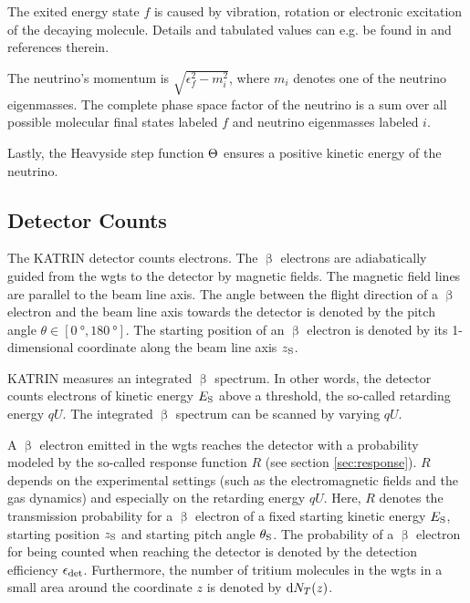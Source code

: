 The exited energy state $f$ is caused by vibration, rotation or electronic excitation of the decaying molecule. Details and tabulated values can e.g. be found in \cite{Bodine2015} and references therein.

The neutrino's momentum is $\sqrt{\epsilon_f^2-m^2_i}$, where $m_i$ denotes one of the neutrino eigenmasses. The complete phase space factor of the neutrino is a sum over all possible molecular final states labeled $f$ and neutrino eigenmasses labeled $i$.

Lastly, the Heavyside step function $\Theta$ ensures a positive kinetic energy of the neutrino.

\subsection{Detector Counts}
The KATRIN detector counts electrons. The $\upbeta$ electrons are adiabatically guided from the \gls{wgts} to the detector by magnetic fields. The magnetic field lines are parallel to the beam line axis. The angle between the flight direction of a $\upbeta$ electron and the beam line axis towards the detector is denoted by the pitch angle $\theta \in [\SI{0}{\degree}, \SI{180}{\degree}]$. The starting position of an $\upbeta$ electron is denoted by its 1-dimensional coordinate along the beam line axis $z_\mathrm{S}$. 

KATRIN measures an integrated $\upbeta$ spectrum. In other words, the detector counts electrons of kinetic energy $E_\mathrm{S}$ above a threshold, the so-called retarding energy $qU$. The integrated $\upbeta$ spectrum can be scanned by varying $qU$.

A $\upbeta$ electron emitted in the \gls{wgts} reaches the detector with a probability modeled by the so-called response function $R$ (see section \ref{sec:response}). $R$ depends on the experimental settings (such as the electromagnetic fields and the gas dynamics) and especially on the retarding energy $qU$. Here, $R$ denotes the transmission probability for a $\upbeta$ electron of a fixed starting kinetic energy $E_\mathrm{S}$, starting position $z_\mathrm{S}$ and starting pitch angle $\theta_\mathrm{S}$. The probability of a $\upbeta$ electron for being counted when reaching the detector is denoted by the detection efficiency $\epsilon_\mathrm{det}$. Furthermore, the number of tritium molecules in the \gls{wgts} in a small area around the coordinate $z$ is denoted by $\mathop{}\!\mathrm{d} N_T(z)$. 

